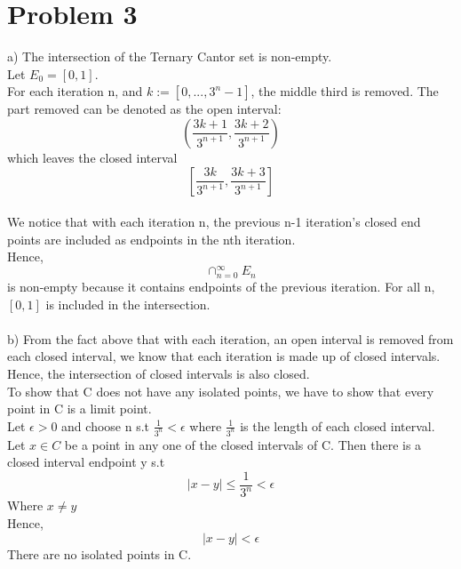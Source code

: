 \documentclass{article}
\begin{document}
\section*{Problem 3}
 a) The intersection of the Ternary Cantor set is non-empty.
 \\Let $E_0 = [0, 1]$.
 \\For each iteration n, and $k := [0, ... ,3^n - 1] $, the middle third is removed. The part removed can be denoted as the open interval: $$(\frac{3k+1}{3^{n+1}}, \frac{3k+2}{3^{n+1}})$$ which leaves the closed interval $$[\frac{3k}{3^{n+1}}, \frac{3k+3}{3^{n+1}}]$$
 \\We notice that with each iteration n, the previous n-1 iteration's closed end points are included as endpoints in the nth iteration.
 \\Hence, $$\cap_{n=0}^{\infty} E_n$$ is non-empty because it contains endpoints of the previous iteration. For all n, $[0, 1]$ is included in the intersection.
 \\
 \\b) From the fact above that with each iteration, an open interval is removed from each closed interval, we know that each iteration is made up of closed intervals. Hence, the intersection of closed intervals is also closed.
 \\To show that C does not have any isolated points, we have to show that every point in C is a limit point.
 \\Let $\epsilon > 0$ and choose n s.t $\frac{1}{3^n} < \epsilon$ where $\frac{1}{3^n}$ is the length of each closed interval.
 \\Let $x \in C$ be a point in any one of the closed intervals of C. Then there is a closed interval endpoint y s.t $$|x-y| \leq \frac{1}{3^n} < \epsilon$$ Where $x \neq y$
 \\Hence, $$|x-y| < \epsilon$$ There are no isolated points in C.
 
\end{document}
